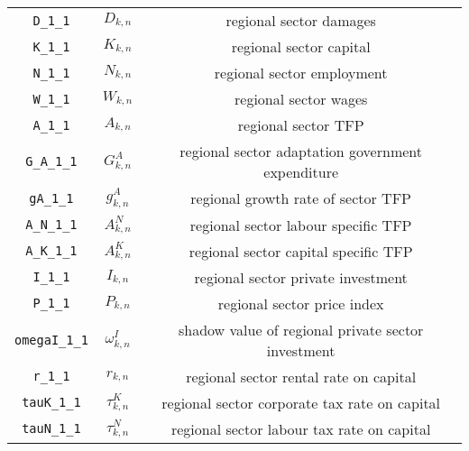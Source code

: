 \begin{center}
\begin{longtable}{ccc}
\texttt{D\_1\_1} & ${D_{k,n}}$ & regional sector damages\\
\texttt{K\_1\_1} & ${K_{k,n}}$ & regional sector capital\\
\texttt{N\_1\_1} & ${N_{k,n}}$ & regional sector employment\\
\texttt{W\_1\_1} & ${W_{k,n}}$ & regional sector wages\\
\texttt{A\_1\_1} & ${A_{k,n}}$ & regional sector TFP\\
\texttt{G\_A\_1\_1} & ${G^{A}_{k,n}}$ & regional sector adaptation government expenditure\\
\texttt{gA\_1\_1} & ${g^{A}_{k,n}}$ & regional growth rate of sector TFP\\
\texttt{A\_N\_1\_1} & ${A^{N}_{k,n}}$ & regional sector labour specific TFP\\
\texttt{A\_K\_1\_1} & ${A^{K}_{k,n}}$ & regional sector capital specific TFP\\
\texttt{I\_1\_1} & ${I_{k,n}}$ & regional sector private investment\\
\texttt{P\_1\_1} & ${P_{k,n}}$ & regional sector price index\\
\texttt{omegaI\_1\_1} & ${\omega^I_{k,n}}$ & shadow value of regional private sector investment\\
\texttt{r\_1\_1} & ${r_{k,n}}$ & regional sector rental rate on capital\\
\texttt{tauK\_1\_1} & ${\tau^{K}_{k,n}}$ & regional sector corporate tax rate on capital\\
\texttt{tauN\_1\_1} & ${\tau^{N}_{k,n}}$ & regional sector labour tax rate on capital\\
\hline%
\end{longtable}
\end{center}
